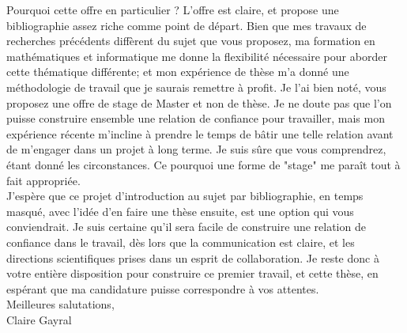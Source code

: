 \documentclass[a4paper,11pt]{article}
\begin{document}
Pourquoi cette offre en particulier ?  L'offre est claire, et propose une bibliographie assez riche comme point de départ. Bien que mes travaux de recherches précédents diffèrent du sujet que vous proposez, ma formation en mathématiques et informatique me donne la flexibilité nécessaire pour aborder cette thématique différente; et mon expérience de thèse m'a donné une méthodologie de travail que je saurais remettre à profit. %
Je l'ai bien noté, vous proposez une offre de stage de Master et non de thèse.
Je ne doute pas que l'on puisse construire ensemble une relation de confiance pour travailler, mais mon expérience récente m'incline à prendre le temps de bâtir une telle relation avant de m'engager dans un projet à long terme. Je suis sûre que vous comprendrez, étant donné les circonstances.
Ce pourquoi une forme de "stage" me paraît tout à fait appropriée.  
%
\\
J'espère que ce projet d'introduction au sujet par bibliographie, en temps masqué, avec l'idée d'en faire une thèse ensuite, est une option qui vous conviendrait. 
Je suis certaine qu'il sera facile de construire une relation de confiance dans le travail, dès lors que la communication est claire, et les directions scientifiques prises dans un esprit de collaboration. 
Je reste donc à votre entière disposition pour construire ce premier travail, et cette thèse, en espérant que ma candidature puisse correspondre à vos attentes. \\

Meilleures salutations, \\

Claire Gayral
\end{document}
